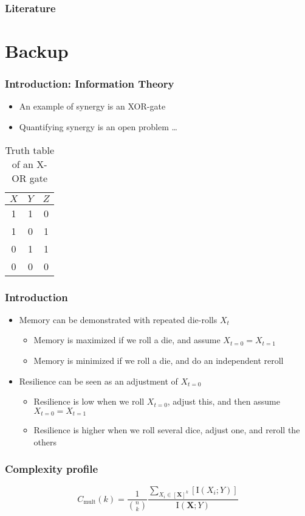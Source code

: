 \documentclass[hyperref={pdfpagelabels=false}]{beamer}
\begin{document}
\begin{frame}[allowframebreaks]
\frametitle{Literature}


\end{frame}


\section{Backup} 
\setcounter{subsection}{1}

\begin{frame}
\frametitle{Introduction: Information Theory}
\begin{itemize}
\item An example of synergy is an XOR-gate
\item Quantifying synergy is an open problem \cite{griffith2011quantifying, olbrich2015information} \dots{}
\end{itemize}
\begin{table}[ht]
\begin{center}
\begin{tabular}{|c|c||c|}
\hline
$X$ & $Y$ & $Z$ \\
\hline
\hline
1 & 1 & 0 \\
1 & 0 & 1 \\
0 & 1 & 1 \\
0 & 0 & 0 \\
\hline
\end{tabular}
\end{center}
\caption{Truth table of an X-OR gate}
\label{XOR}
\end{table}
\end{frame}

\begin{frame}
\frametitle{Introduction}
\begin{itemize}
\item Memory can be demonstrated with repeated die-rolls $X_t$
\begin{itemize}
\item Memory is maximized if we roll a die, and assume $X_{t=0} = X_{t=1}$
\item Memory is minimized if we roll a die, and do an independent reroll
\end{itemize}
\item Resilience can be seen as an adjustment of $X_{t=0}$
\begin{itemize}
\item Resilience is low when we roll $X_{t=0}$, adjust this, and then assume $X_{t=0} = X_{t=1}$
\item Resilience is higher when we roll several dice, adjust one, and reroll the others
\end{itemize}
\end{itemize}
\end{frame}

\begin{frame}
\frametitle{Complexity profile}
%
\begin{equation}
C_\mathrm{mult}(k) = \frac{1}{\binom{n}{k}}\frac{\sum_{X_i \in [\mathbf{X}]^k} [\mathrm{I}\left( X_i;Y \right)]}{\mathrm{I}\left( \mathbf{X};Y\right)}
\end{equation}
\end{frame}
\end{document}
